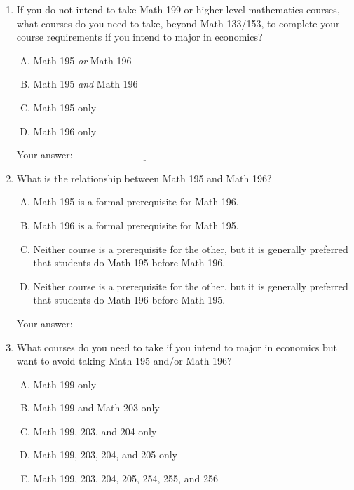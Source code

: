 \documentclass[10pt]{amsart}
\begin{document}
\begin{enumerate}

\item If you do not intend to take Math 199 or higher level
  mathematics courses, what courses do you need to take, beyond Math
  133/153, to complete your course requirements if you intend to major
  in economics?

  \begin{enumerate}[(A)]
  \item Math 195 {\em or} Math 196
  \item Math 195 {\em and} Math 196
  \item Math 195 only
  \item Math 196 only
  \end{enumerate}

  \vspace{0.1in}
  Your answer: $\underline{\qquad\qquad\qquad\qquad\qquad\qquad\qquad}$
  \vspace{0.1in}

\item What is the relationship between Math 195 and Math 196?

  \begin{enumerate}[(A)]
  \item Math 195 is a formal prerequisite for Math 196.
  \item Math 196 is a formal prerequisite for Math 195.
  \item Neither course is a prerequisite for the other, but it is generally preferred that students do Math 195 before Math 196.
  \item Neither course is a prerequisite for the other, but it is
    generally preferred that students do Math 196 before Math 195.
  \end{enumerate}

  \vspace{0.1in}
  Your answer: $\underline{\qquad\qquad\qquad\qquad\qquad\qquad\qquad}$
  \vspace{0.1in}

\item What courses do you need to take if you intend to major in
  economics but want to avoid taking Math 195 and/or Math 196?

  \begin{enumerate}[(A)]
  \item Math 199 only
  \item Math 199 and Math 203 only
  \item Math 199, 203, and 204 only
  \item Math 199, 203, 204, and 205 only
  \item Math 199, 203, 204, 205, 254, 255, and 256
  \end{enumerate}


\end{enumerate}
\end{document}
